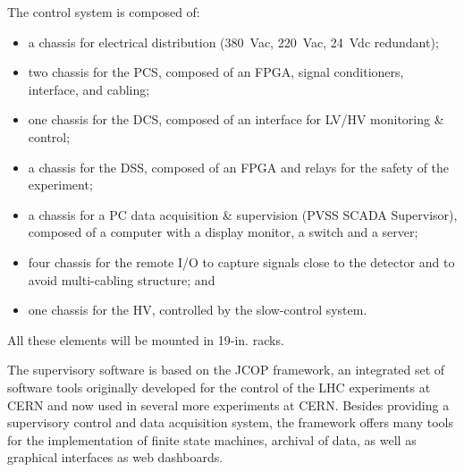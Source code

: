 The control system is composed of:
\begin{itemize}
\item a chassis for electrical distribution (380~Vac, 220~Vac, 24~Vdc redundant);
\item two chassis for the PCS, composed of an FPGA, signal conditioners, interface, and cabling;
\item  one chassis for the DCS,  composed of an interface for LV/HV monitoring \& control; 
\item a chassis for the DSS, composed of an FPGA and relays for the safety of the experiment; 
\item a chassis for a PC data acquisition \& supervision (PVSS SCADA Supervisor), composed of a computer with a display monitor, a switch and a server; 
\item four chassis for the remote I/O to capture signals close to the detector and to avoid multi-cabling structure; and
\item  one chassis for the HV, controlled by the slow-control system. 
\end{itemize}
All these elements will be mounted in 19-in. racks.

The supervisory software is based on the JCOP framework, an integrated set of software tools originally developed for the control of the LHC experiments at CERN and now used in several more experiments at CERN. Besides providing a supervisory control and data acquisition system, the framework offers many tools for the implementation of finite state machines, archival of data, as well as graphical interfaces as web dashboards.

